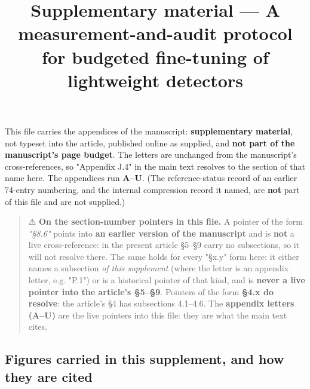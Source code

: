 \documentclass[pdflatex,sn-mathphys-ay]{sn-jnl}
\begin{document}
\author*[1]{ }

\title[Supplementary material]{Supplementary material --- A measurement-and-audit protocol for budgeted fine-tuning of lightweight detectors}

\maketitle

\tableofcontents
\clearpage

This file carries the appendices of the manuscript: \textbf{supplementary material}, not typeset into the article, published online as supplied, and \textbf{not part of the manuscript's page budget}. The letters are unchanged from the manuscript's cross-references, so "Appendix J.4" in the main text resolves to the section of that name here. The appendices run \textbf{A--U}. (The reference-status record of an earlier 74-entry numbering, and the internal compression record it named, are \textbf{not} part of this file and are not supplied.)

\begin{quote}
⚠ \textbf{On the section-number pointers in this file.} A pointer of the form \emph{"\S{}8.6"} points into \textbf{an earlier version of the manuscript} and is \textbf{not} a live cross-reference: in the present article \S{}5--\S{}9 carry no subsections, so it will not resolve there. The same holds for every "\S{}x.y" form here: it either names a subsection \emph{of this supplement} (where the letter is an appendix letter, e.g. "P.1") or is a historical pointer of that kind, and is \textbf{never a live pointer into the article's \S{}5--\S{}9}. Pointers of the form \textbf{\S{}4.x do resolve}: the article's \S{}4 has subsections 4.1--4.6. The \textbf{appendix letters (A--U)} are the live pointers into this file: they are what the main text cites.
\end{quote}

\subsection*{Figures carried in this supplement, and how they are cited}
\end{document}
